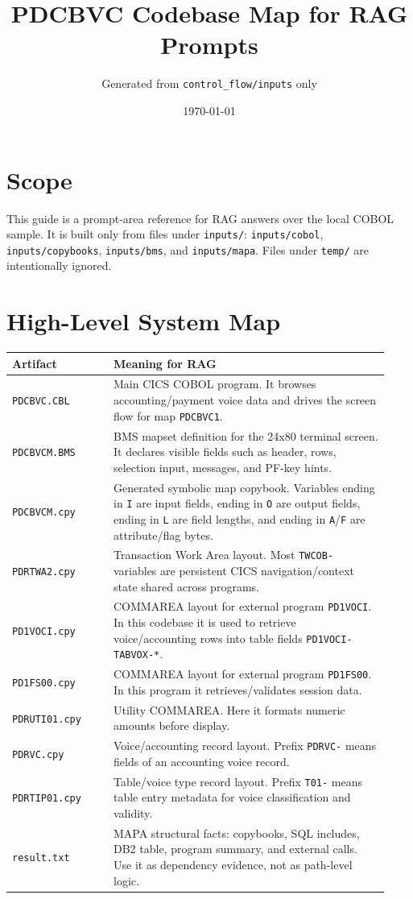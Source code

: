 \documentclass[11pt,a4paper]{article}
\title{PDCBVC Codebase Map for RAG Prompts}
\author{Generated from \texttt{control\_flow/inputs} only}
\date{\today}
\begin{document}
\maketitle

\section*{Scope}

This guide is a prompt-area reference for RAG answers over the local COBOL sample.
It is built only from files under \texttt{inputs/}: \texttt{inputs/cobol},
\texttt{inputs/copybooks}, \texttt{inputs/bms}, and \texttt{inputs/mapa}.
Files under \texttt{temp/} are intentionally ignored.

\section*{High-Level System Map}

\begin{longtable}{>{\raggedright\arraybackslash}p{0.25\linewidth} >{\raggedright\arraybackslash}p{0.68\linewidth}}
\textbf{Artifact} & \textbf{Meaning for RAG} \\
\hline
\texttt{PDCBVC.CBL} & Main CICS COBOL program. It browses accounting/payment voice data and drives the screen flow for map \texttt{PDCBVC1}. \\
\texttt{PDCBVCM.BMS} & BMS mapset definition for the 24x80 terminal screen. It declares visible fields such as header, rows, selection input, messages, and PF-key hints. \\
\texttt{PDCBVCM.cpy} & Generated symbolic map copybook. Variables ending in \texttt{I} are input fields, ending in \texttt{O} are output fields, ending in \texttt{L} are field lengths, and ending in \texttt{A}/\texttt{F} are attribute/flag bytes. \\
\texttt{PDRTWA2.cpy} & Transaction Work Area layout. Most \texttt{TWCOB-} variables are persistent CICS navigation/context state shared across programs. \\
\texttt{PD1VOCI.cpy} & COMMAREA layout for external program \texttt{PD1VOCI}. In this codebase it is used to retrieve voice/accounting rows into table fields \texttt{PD1VOCI-TABVOX-*}. \\
\texttt{PD1FS00.cpy} & COMMAREA layout for external program \texttt{PD1FS00}. In this program it retrieves/validates session data. \\
\texttt{PDRUTI01.cpy} & Utility COMMAREA. Here it formats numeric amounts before display. \\
\texttt{PDRVC.cpy} & Voice/accounting record layout. Prefix \texttt{PDRVC-} means fields of an accounting voice record. \\
\texttt{PDRTIP01.cpy} & Table/voice type record layout. Prefix \texttt{T01-} means table entry metadata for voice classification and validity. \\
\texttt{result.txt} & MAPA structural facts: copybooks, SQL includes, DB2 table, program summary, and external calls. Use it as dependency evidence, not as path-level logic. \\
\end{longtable}
\end{document}
